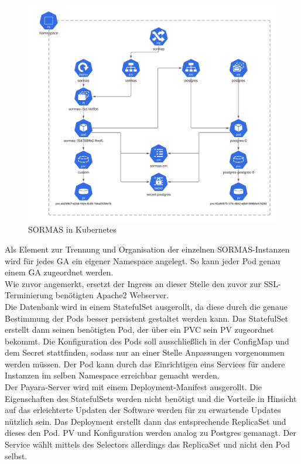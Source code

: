 \begin{figure}[h!]
\centering    
\includegraphics[width=\textwidth]{bilder/sormas_kubernetes.png}
\caption{SORMAS in Kubernetes}
\label{fig:sormas_kubernetes}
\end{figure}

Als Element zur Trennung und Organisation der einzelnen \ac{SORMAS}-Instanzen wird für jedes \ac{GA} ein eigener Namespace angelegt.
So kann jeder Pod genau einem \ac{GA} zugeordnet werden.\\
Wie zuvor angemerkt, ersetzt der Ingress an dieser Stelle den zuvor zur \ac{SSL}-Terminierung benötigten Apache2 Webserver.\\
Die Datenbank wird in einem StatefulSet ausgerollt, da diese durch die genaue Bestimmung der Pods besser persistent gestaltet werden kann.
Das StatefulSet erstellt dann seinen benötigten Pod, der über ein \ac{PVC} sein \ac{PV} zugeordnet bekommt. 
Die Konfiguration des Pods soll ausschließlich in der ConfigMap und dem Secret stattfinden, sodass nur an einer Stelle Anpassungen vorgenommen werden müssen.
Der Pod kann durch das Einrichtigen eins Services für andere Instanzen im selben Namespace erreichbar gemacht werden.\\
Der Payara-Server wird mit einem Deployment-Manifest ausgerollt. 
Die Eigenschaften des StatefulSets werden nicht benötigt und die Vorteile in Hinsicht auf das erleichterte Updaten der Software werden für zu erwartende Updates nützlich sein.
Das Deployment erstellt dann das entsprechende ReplicaSet und dieses den Pod. 
\ac{PV} und Konfiguration werden analog zu Postgres gemanagt. 
Der Service wählt mittels des Selectors allerdings das ReplicaSet und nicht den Pod selbst.



